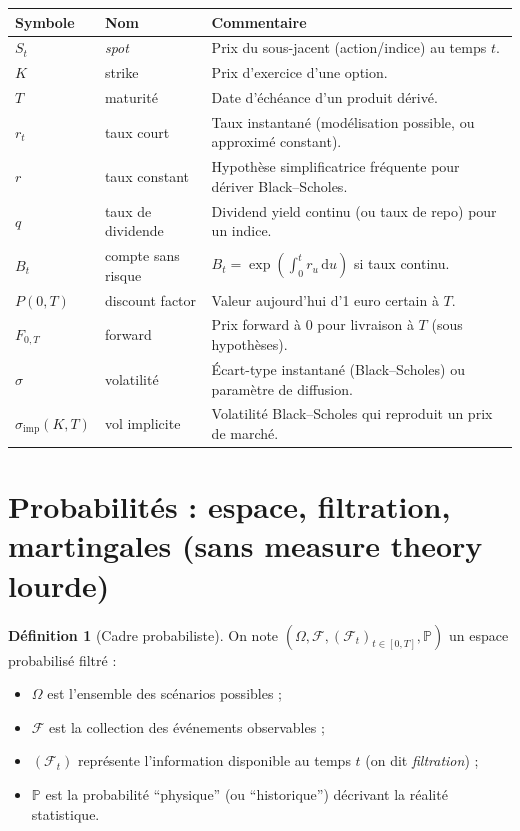 \documentclass[11pt,a4paper]{report}
\newcommand{\dd}{\mathrm{d}}
\newcommand{\Prob}{\mathbb{P}}
\newcommand{\1}{\mathbbm{1}}
\newcommand{\F}{\mathcal{F}}
\theoremstyle{definition}
\newtheorem{definition}{Définition}[chapter]
\theoremstyle{plain}
\theoremstyle{remark}
\begin{document}
\begin{longtable}{@{}llp{8.5cm}@{}}
\toprule
Symbole & Nom & Commentaire \\
\midrule
$S_t$ & \emph{spot} & Prix du sous-jacent (action/indice) au temps $t$. \\
$K$ & strike & Prix d'exercice d'une option. \\
$T$ & maturité & Date d'échéance d'un produit dérivé. \\
$r_t$ & taux court & Taux instantané (modélisation possible, ou approximé constant). \\
$r$ & taux constant & Hypothèse simplificatrice fréquente pour dériver Black--Scholes. \\
$q$ & taux de dividende & Dividend yield continu (ou taux de repo) pour un indice. \\
$B_t$ & compte sans risque & $B_t=\exp(\int_0^t r_u\,\dd u)$ si taux continu. \\
$P(0,T)$ & discount factor & Valeur aujourd'hui d'1 euro certain à $T$. \\
$F_{0,T}$ & forward & Prix forward à $0$ pour livraison à $T$ (sous hypothèses). \\
$\sigma$ & volatilité & Écart-type instantané (Black--Scholes) ou paramètre de diffusion. \\
$\sigma_{\mathrm{imp}}(K,T)$ & vol implicite & Volatilité Black--Scholes qui reproduit un prix de marché. \\
\bottomrule
\end{longtable}

\section{Probabilités : espace, filtration, martingales (sans measure theory lourde)}
\label{sec:proba_filtration}

\begin{definition}[Cadre probabiliste]
On note $(\Omega,\F,(\F_t)_{t\in[0,T]},\Prob)$ un espace probabilisé filtré :
\begin{itemize}
  \item $\Omega$ est l'ensemble des scénarios possibles ;
  \item $\F$ est la collection des événements observables ;
  \item $(\F_t)$ représente l'information disponible au temps $t$ (on dit \emph{filtration}) ;
  \item $\Prob$ est la probabilité ``physique'' (ou ``historique'') décrivant la réalité statistique.
\end{itemize}
\end{definition}
\end{document}
